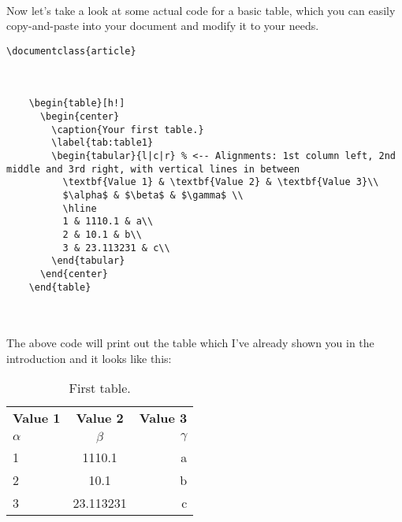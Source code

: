   \paragraph{}
  Now let's take a look at some actual code for a basic table, which you can easily copy-and-paste into your document and modify it to your needs.

  \begin{lstlisting}[language={[LaTeX]TeX},breaklines=true,frame=single]
    \documentclass{article}

    
    
    \begin{table}[h!]
      \begin{center}
        \caption{Your first table.}
        \label{tab:table1}
        \begin{tabular}{l|c|r} % <-- Alignments: 1st column left, 2nd middle and 3rd right, with vertical lines in between
          \textbf{Value 1} & \textbf{Value 2} & \textbf{Value 3}\\
          $\alpha$ & $\beta$ & $\gamma$ \\
          \hline
          1 & 1110.1 & a\\
          2 & 10.1 & b\\
          3 & 23.113231 & c\\
        \end{tabular}
      \end{center}
    \end{table}
    
    
  \end{lstlisting}

  \paragraph{}
  The above code will print out the table which I've already shown you in the introduction and it looks like this:

  \begin{table}[h!]
    \begin{center}
      \caption{First table.}
      \label{tab:table1}
      \begin{tabular}{l|c|r} %
        \textbf{Value 1} & \textbf{Value 2} & \textbf{Value 3}\\
        $\alpha$ & $\beta$ & $\gamma$ \\
        \hline
        1 & 1110.1 & a\\
        2 & 10.1 & b\\
        3 & 23.113231 & c\\
      \end{tabular}
    \end{center}
  \end{table}
